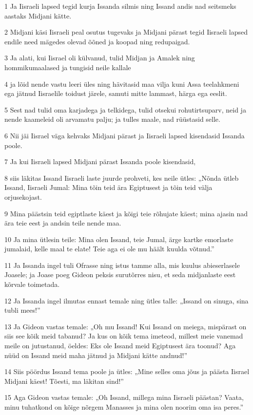 \par 1 Ja Iisraeli lapsed tegid kurja Issanda silmis ning Issand andis nad seitsmeks aastaks Midjani kätte.
\par 2 Midjani käsi Iisraeli peal osutus tugevaks ja Midjani pärast tegid Iisraeli lapsed endile need mägedes olevad õõned ja koopad ning redupaigad.
\par 3 Ja alati, kui Iisrael oli külvanud, tulid Midjan ja Amalek ning hommikumaalased ja tungisid neile kallale
\par 4 ja lõid nende vastu leeri üles ning hävitasid maa vilja kuni Assa teelahkmeni ega jätnud Iisraelile toidust järele, samuti mitte lammast, härga ega eeslit.
\par 5 Sest nad tulid oma karjadega ja telkidega, tulid otsekui rohutirtsuparv, neid ja nende kaameleid oli arvamatu palju; ja tulles maale, nad rüüstasid selle.
\par 6 Nii jäi Iisrael väga kehvaks Midjani pärast ja Iisraeli lapsed kisendasid Issanda poole.
\par 7 Ja kui Iisraeli lapsed Midjani pärast Issanda poole kisendasid,
\par 8 siis läkitas Issand Iisraeli laste juurde prohveti, kes neile ütles: „Nõnda ütleb Issand, Iisraeli Jumal: Mina tõin teid ära Egiptusest ja tõin teid välja orjusekojast.
\par 9 Mina päästsin teid egiptlaste käest ja kõigi teie rõhujate käest; mina ajasin nad ära teie eest ja andsin teile nende maa.
\par 10 Ja mina ütlesin teile: Mina olen Issand, teie Jumal, ärge kartke emorlaste jumalaid, kelle maal te elate! Teie aga ei ole mu häält kuulda võtnud.”
\par 11 Ja Issanda ingel tuli Ofrasse ning istus tamme alla, mis kuulus abieserlasele Joasele; ja Joase poeg Gideon peksis surutõrres nisu, et seda midjanlaste eest kõrvale toimetada.
\par 12 Ja Issanda ingel ilmutas ennast temale ning ütles talle: „Issand on sinuga, sina tubli mees!”
\par 13 Ja Gideon vastas temale: „Oh mu Issand! Kui Issand on meiega, mispärast on siis see kõik meid tabanud? Ja kus on kõik tema imeteod, millest meie vanemad meile on jutustanud, öeldes: Eks ole Issand meid Egiptusest ära toonud? Aga nüüd on Issand meid maha jätnud ja Midjani kätte andnud!”
\par 14 Siis pöördus Issand tema poole ja ütles: „Mine selles oma jõus ja päästa Iisrael Midjani käest! Tõesti, ma läkitan sind!”
\par 15 Aga Gideon vastas temale: „Oh Issand, millega mina Iisraeli päästan? Vaata, minu tuhatkond on kõige nõrgem Manasses ja mina olen noorim oma isa peres.”
